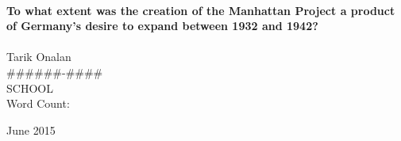 \begin{titlepage}
    \begin{center}
        \HRule \\[0.4cm]
        { \large \bfseries To what extent was the creation of the Manhattan Project a product of Germany's desire to expand between 1932 and 1942? \\[0.4cm] }
        \HRule \\[1.5cm]

        Tarik Onalan
        \\[0.4cm]
        \#\#\#\#\#\#-\#\#\#\#
        \\[0.4cm]
        SCHOOL
        \\[0.4cm]
        Word Count:
        \vfill

        {\large June 2015}
    \end{center}
\end{titlepage}
